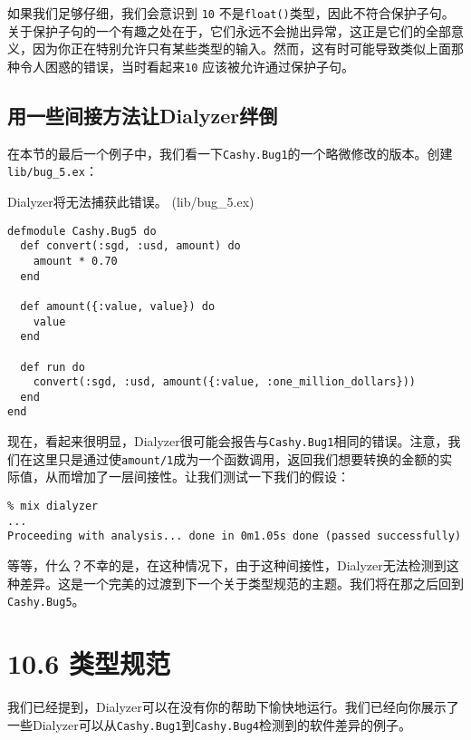 如果我们足够仔细，我们会意识到 \texttt{10} 不是\texttt{float()}类型，因此不符合保护子句。
关于保护子句的一个有趣之处在于，它们永远不会抛出异常，这正是它们的全部意义，因为你正在特别允许只有某些类型的输入。然而，这有时可能导致类似上面那种令人困惑的错误，当时看起来\texttt{10} 应该被允许通过保护子句。

\subsection{用一些间接方法让Dialyzer绊倒}

在本节的最后一个例子中，我们看一下\texttt{Cashy.Bug1}的一个略微修改的版本。创建\texttt{lib/bug\_5.ex}：

\begin{code}{Dialyzer将无法捕获此错误。 (lib/bug\_5.ex)}

\begin{verbatim}
defmodule Cashy.Bug5 do
  def convert(:sgd, :usd, amount) do
    amount * 0.70
  end

  def amount({:value, value}) do
    value
  end

  def run do
    convert(:sgd, :usd, amount({:value, :one_million_dollars}))
  end
end
\end{verbatim}
\end{code}

现在，看起来很明显，Dialyzer很可能会报告与\texttt{Cashy.Bug1}相同的错误。注意，我们在这里只是通过使\texttt{amount/1}成为一个函数调用，返回我们想要转换的金额的实际值，从而增加了一层间接性。让我们测试一下我们的假设：

\begin{code}{}
\begin{verbatim}
% mix dialyzer
...
Proceeding with analysis... done in 0m1.05s done (passed successfully)
\end{verbatim}
\end{code}

等等，什么？不幸的是，在这种情况下，由于这种间接性，Dialyzer无法检测到这种差异。这是一个完美的过渡到下一个关于类型规范的主题。我们将在那之后回到\texttt{Cashy.Bug5}。

\section{10.6 类型规范}

我们已经提到，Dialyzer可以在没有你的帮助下愉快地运行。我们已经向你展示了一些Dialyzer可以从\texttt{Cashy.Bug1}到\texttt{Cashy.Bug4}检测到的软件差异的例子。

